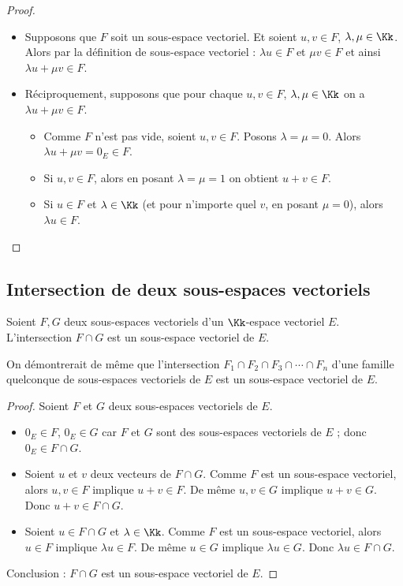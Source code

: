 \documentclass[class=report,crop=false]{standalone}
\begin{document}
\begin{proof}~
\begin{itemize}
  \item Supposons que $F$ soit un sous-espace vectoriel.
  Et soient $u,v\in F$, $\lambda,\mu\in\Kk$. Alors
  par la définition de sous-espace vectoriel : $\lambda u \in F$
  et $\mu v \in F$ et ainsi $\lambda u + \mu v \in F$.

  \item Réciproquement, supposons que pour chaque $u,v \in F$, $\lambda, \mu \in \Kk$
  on a $\lambda u + \mu v \in F$.
  \begin{itemize}
    \item Comme $F$ n'est pas vide, soient $u,v\in F$. Posons $\lambda=\mu=0$. Alors $\lambda u +\mu v = 0_E \in F$.
    \item Si $u,v\in F$, alors en posant $\lambda =\mu =1$ on obtient $u+v \in F$.
    \item Si $u \in F$ et $\lambda \in \Kk$ (et pour n'importe quel $v$, en posant $\mu=0$),
    alors $\lambda u \in F$.
  \end{itemize}
\end{itemize}
\end{proof}


\subsection{Intersection de deux sous-espaces vectoriels}



\begin{proposition}
Soient $F,G$ deux sous-espaces vectoriels d'un $\Kk$-espace vectoriel $E$.
L'intersection $F \cap G$ est un sous-espace vectoriel de $E$.
\end{proposition}

On démontrerait de même que l'intersection $F_1 \cap F_2 \cap F_3 \cap \cdots \cap F_n$
d'une famille quelconque de sous-espaces vectoriels de $E$ est un sous-espace
vectoriel de $E$.


\begin{proof}
Soient $F$ et $G$ deux sous-espaces vectoriels de $E$.
\begin{itemize}
  \item $0_E \in F$, $0_E\in G$ car $F$ et $G$ sont des sous-espaces vectoriels de $E$ ;
  donc $0_E \in F \cap G$.
  \item Soient $u$ et $v$ deux vecteurs de  $F \cap G$.
  Comme $F$ est un sous-espace vectoriel, alors $u,v \in F$ implique $u+v\in F$.
  De même $u,v \in G$ implique $u+v \in G$. Donc $u+v \in F \cap G$.
  \item Soient $u \in F\cap G$ et $\lambda  \in \Kk$. Comme $F$ est un sous-espace vectoriel,
  alors $u \in F$ implique $\lambda u \in F$. De même $u \in G$ implique $\lambda u \in G$.
  Donc $\lambda u \in F \cap G$.
\end{itemize}
Conclusion : $F\cap G$ est un sous-espace vectoriel de $E$.
\end{proof}
\end{document}
